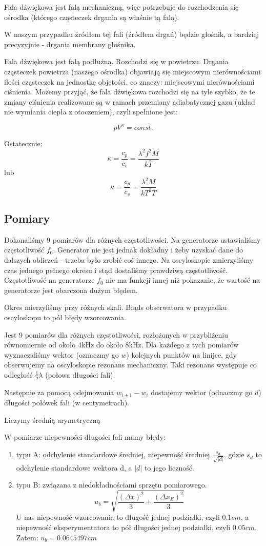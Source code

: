 \documentclass[12pt,a4paper]{article}
\begin{document}
Fala dźwiękowa jest falą mechaniczną, więc potrzebuje do rozchodzenia się ośrodka (którego cząsteczek drgania są właśnie tą falą).  

W naszym przypadku źródłem tej fali (źródłem drgań) będzie głośnik, a bardziej precyzyjnie - drgania membrany głośnika. 

Fala dźwiękowa jest falą podłużną. Rozchodzi się w powietrzu. Drgania cząsteczek powietrza (naszego ośrodka) objawiają się miejscowym nierównościami ilości cząsteczek na jednostkę objętości, co znaczy: miejscowymi nierównościami ciśnienia.
Możemy przyjąć, że fala dźwiękowa rozchodzi się na tyle szybko, że te zmiany ciśnienia realizowane są w ramach przemiany adiabatycznej gazu (układ nie wymiania ciepła z otoczeniem), czyli spełnione jest: 

$$
pV^\kappa = const.
$$


Ostatecznie:
$$
\kappa = \frac{c_p}{c_v} = \frac{\lambda^2 f^2 M}{k\bar{T}}
$$
lub
$$
\kappa = \frac{c_p}{c_v} = \frac{\lambda^2 M}{k T^2 \bar{T}}
$$


\subsection{Pomiary}
Dokonaliśmy 9 pomiarów dla różnych częstotliwości. Na generatorze ustawialiśmy częstotliwość $f_0$. Generator nie jest jednak dokładny i żeby uzyskać dane do dalszych obliczeń - trzeba było zrobić coś innego. Na oscyloskopie zmierzyliśmy czas jednego pełnego okresu i stąd dostaliśmy prawdziwą częstotliwość. Częstotliwość na generatorze $f_0$ nie ma funkcji innej niż pokazanie, że wartość na generatorze jest obarczona dużym błędem. 

Okres mierzyliśmy przy różnych skali. Błąds obserwatora w przypadku oscyloskopu to pół błędy wzorcowania.

Jest 9 pomiarów dla różnych częstotliwości, rozłożonych w przybliżeniu równomiernie od około 4kHz do około 8kHz. 
Dla każdego z tych pomiarów wyznaczaliśmy wektor (oznaczmy go $w$) kolejnych punktów na linijce, gdy obserwujemy na oscyloskopie rezonans mechaniczny. Taki rezonans występuje co odległość $\frac{1}{2}\lambda$ (połowa długości fali). 

Następnie za pomocą odejmowania $w_{i+1}-w_i$  dostajemy wektor (odnaczmy go $d$) długości połówek fali (w centymetrach). 

Liczymy średnią arymetryczną 

W pomiarze niepewności długości fali mamy błędy:
\begin{enumerate}
\item  typu A: odchylenie standardowe średniej, niepewność średniej $\frac{s_d}{\sqrt{|d|}}$, gdzie $s_d$ to odchylenie standardowe wektora d, a $|d|$ to jego liczność. 
\item typu B: związana z niedokładnościami sprzętu pomiarowego. $$u_b = \sqrt{\frac{(\Delta x)^2}{3} + \frac{(\Delta x_E)^2}{3}}$$
U nas niepewność wzorcowania to długość jednej podziałki, czyli $0.1 cm$, a niepewność eksperymentatora to pół długości jednej podziałki, czyli $0.05 cm$.
Zatem: $u_b = 0.0645497cm $
\end{enumerate} 
\end{document}

